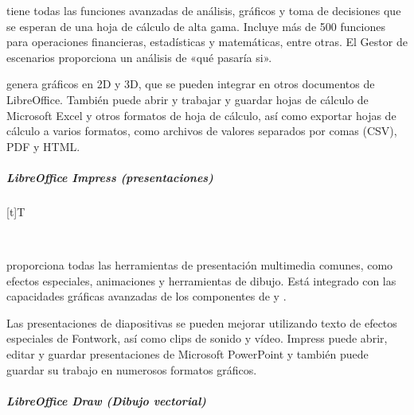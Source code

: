\documentclass[letterpaper,10pt,spanish]{sphinxmanual}
\let\sphinxpxdimen\pdfpxdimen\else\newdimen\sphinxpxdimen
\begin{document}
\sphinxAtStartPar
{} tiene todas las funciones avanzadas de análisis, gráficos y toma de decisiones que se esperan de una hoja de cálculo de alta gama. Incluye más de 500 funciones para operaciones financieras, estadísticas y matemáticas, entre otras. El Gestor de escenarios proporciona un análisis de «qué pasaría si».

\sphinxAtStartPar
{} genera gráficos en 2D y 3D, que se pueden integrar en otros documentos de LibreOffice. También puede abrir y trabajar y guardar hojas de cálculo de Microsoft Excel y otros formatos de hoja de cálculo, así como exportar hojas de cálculo a varios formatos, como archivos de valores separados por comas (CSV), PDF y HTML.


\subparagraph{LibreOffice Impress (presentaciones)}
\label{\detokenize{cursos/ofimatica10/recursos/T03:libreoffice-impress-presentaciones}}

\begin{savenotes}\sphinxattablestart
\sphinxthistablewithglobalstyle
\centering
\begin{tabulary}{\linewidth}[t]{T}
\sphinxtoprule
\sphinxtableatstartofbodyhook

\begin{sphinxfigure-in-table}
\centering
\capstart
\noindent\sphinxincludegraphics[width=270\sphinxpxdimen]{{image18}.png}
\label{\detokenize{cursos/ofimatica10/recursos/T03:id10}}\end{sphinxfigure-in-table}\relax
\\
\sphinxbottomrule
\end{tabulary}
\sphinxtableafterendhook\par
\sphinxattableend\end{savenotes}

\sphinxAtStartPar
{} proporciona todas las herramientas de presentación multimedia comunes, como efectos especiales, animaciones y herramientas de dibujo. Está integrado con las capacidades gráficas avanzadas de los componentes de  y .

\sphinxAtStartPar
Las presentaciones de diapositivas se pueden mejorar utilizando texto de efectos especiales de Fontwork, así como clips de sonido y vídeo. Impress puede abrir, editar y guardar presentaciones de Microsoft PowerPoint y también puede guardar su trabajo en numerosos formatos gráficos.


\subparagraph{LibreOffice Draw (Dibujo vectorial)}
\label{\detokenize{cursos/ofimatica10/recursos/T03:libreoffice-draw-dibujo-vectorial}}
\end{document}
